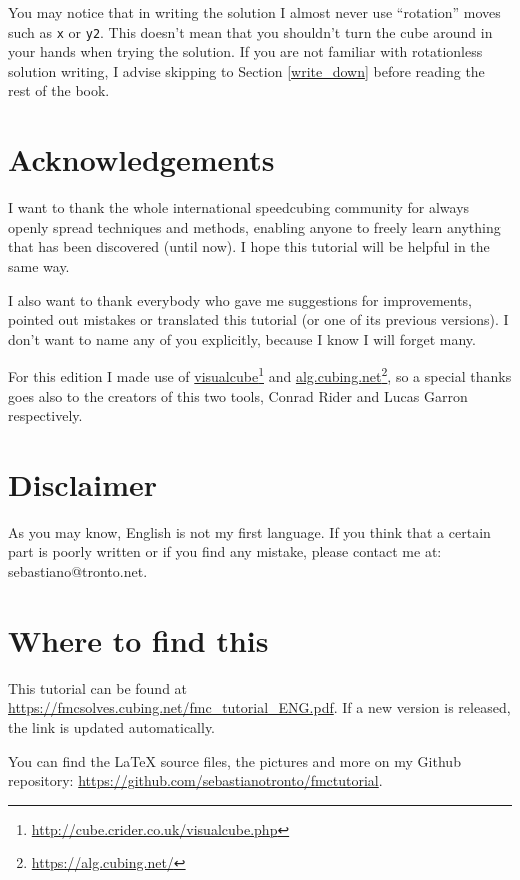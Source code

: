 \documentclass[11pt,a4paper]{book}
\newcommand{\m}{\texttt}
\begin{document}
You may notice that in writing the solution I almost never use ``rotation'' moves such as \m x or \m{y2}. This doesn't mean that you shouldn't turn the cube around in your hands when trying the solution. If you are not familiar with rotationless solution writing, I advise skipping to Section \ref{write_down} before reading the rest of the book.

\section*{Acknowledgements}

I want to thank the whole international speedcubing community for always openly spread techniques and methods, enabling anyone to freely learn anything that has been discovered (until now). I hope this tutorial will be helpful in the same way.

I also want to thank everybody who gave me suggestions for improvements, pointed out mistakes or translated this tutorial (or one of its previous versions). I don't want to name any of you explicitly, because I know I will forget many.

For this edition I made use of \href{http://cube.crider.co.uk/visualcube.php}{visualcube}\footnote{\url{http://cube.crider.co.uk/visualcube.php}%
} and \href{https://alg.cubing.net/}{alg.cubing.net}\footnote{\url{https://alg.cubing.net/}}, so a special thanks goes also to the creators of this two tools, Conrad Rider and Lucas Garron respectively.

\section*{Disclaimer}

As you may know, English is not my first language. If you think that a certain part is poorly written or if you find any mistake, please contact me at:
sebastiano@tronto.net.

\section*{Where to find this}

This tutorial can be found at \url{https://fmcsolves.cubing.net/fmc_tutorial_ENG.pdf}. If a new version is released, the link is updated automatically.

You can find the LaTeX source files, the pictures and more on my Github repository: \url{https://github.com/sebastianotronto/fmctutorial}.
\end{document}
